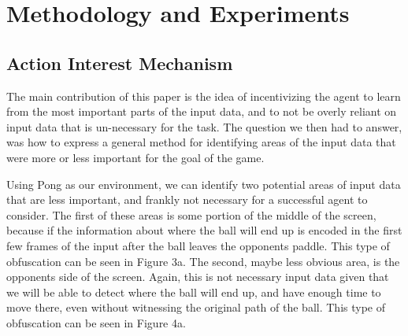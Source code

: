 \documentclass{article}
\begin{document}
\section{Methodology and Experiments}

\subsection{Action Interest Mechanism}

The main contribution of this paper is the idea of incentivizing the agent to learn from the most important parts of the input data, and
to not be overly reliant on input data that is un-necessary for the task. The question we then had to answer, was how to express a general
method for identifying areas of the input data that were more or less important for the goal of the game.

Using Pong as our environment, we can identify two potential areas of input data that are less important, and frankly not necessary for a
successful agent to consider. The first of these areas is some portion of the middle of the screen, because if the information about where the ball
will end up is encoded in the first few frames of the input after the ball leaves the opponents paddle. This type of obfuscation can be seen in Figure 3a. 
The second, maybe less obvious area, is the opponents side of the screen. Again, this is not necessary input data given that we will be able to detect 
where the ball will end up, and have enough time to move there, even without witnessing the original path of the ball. This type of obfuscation can be seen in Figure 4a.
\end{document}
